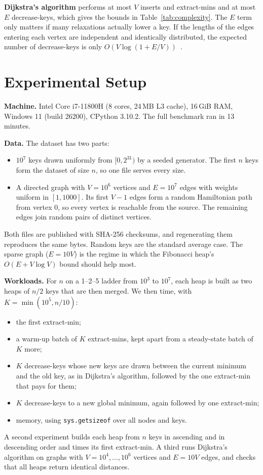 \documentclass[acmsmall,nonacm]{acmart}
\newcommand{\code}[1]{\texttt{#1}}
\begin{document}
\textbf{Dijkstra's algorithm} performs at most $V$ inserts and extract-mins and
at most $E$ decrease-keys, which gives the bounds in
Table~\ref{tab:complexity}. The $E$ term only matters if many relaxations
actually lower a key. If the lengths of the edges entering each vertex are
independent and identically distributed, the expected number of decrease-keys
is only $O(V\log(1 + E/V))$~\cite{goldberg1996}.

\section{Experimental Setup}
\label{sec:setup}

\textbf{Machine.} Intel Core i7-11800H (8 cores, 24\,MB L3 cache), 16\,GiB
RAM, Windows 11 (build 26200), CPython 3.10.2. The full benchmark ran in 13
minutes.

\textbf{Data.} The dataset has two parts:
\begin{itemize}
  \item $10^7$ keys drawn uniformly from $[0, 2^{31})$ by a seeded generator. The first $n$ keys form the dataset of size $n$, so one file serves every size.
  \item A directed graph with $V = 10^6$ vertices and $E = 10^7$ edges with weights uniform in $[1, 1000]$. Its first $V-1$ edges form a random Hamiltonian path from vertex 0, so every vertex is reachable from the source. The remaining edges join random pairs of distinct vertices.
\end{itemize}
Both files are published with SHA-256 checksums, and regenerating them
reproduces the same bytes. Random keys are the standard average case. The
sparse graph ($E = 10V$) is the regime in which the Fibonacci heap's
$O(E + V\log V)$ bound should help most.

\textbf{Workloads.} For $n$ on a 1--2--5 ladder from $10^3$ to $10^7$, each
heap is built as two heaps of $n/2$ keys that are then merged. We then time,
with $K = \min(10^5, n/10)$:
\begin{itemize}
  \item the first extract-min;
  \item a warm-up batch of $K$ extract-mins, kept apart from a steady-state batch of $K$ more;
  \item $K$ decrease-keys whose new keys are drawn between the current minimum and the old key, as in Dijkstra's algorithm, followed by the one extract-min that pays for them;
  \item $K$ decrease-keys to a new global minimum, again followed by one extract-min;
  \item memory, using \code{sys.getsizeof} over all nodes and keys.
\end{itemize}
A second experiment builds each heap from $n$ keys in ascending and in
descending order and times its first extract-min. A third runs Dijkstra's
algorithm on graphs with $V = 10^4, \dots, 10^6$ vertices and $E = 10V$ edges,
and checks that all heaps return identical distances.
\end{document}
